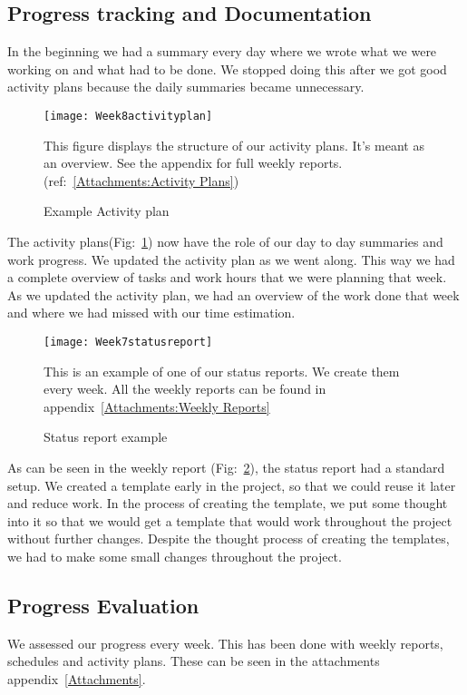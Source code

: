     \subsection{Progress tracking and Documentation}\label{Progress tracking and Documentation}
    In the beginning we had a summary every day where we wrote what we were working on and what had to be done. We stopped doing this after we got good activity plans because the daily summaries became unnecessary. 
    
    \begin{figure}[H]
        \centering
        \texttt{[image: Week8activityplan]}
        \caption{Example Activity plan}
        This figure displays the structure of our activity plans. It's meant as an overview. See the appendix for full weekly reports. 
        (ref:~\ref{Attachments:Activity Plans})
        \label{fig:Week8activityplan}
    \end{figure}
    
    The activity plans(Fig:~\ref{fig:Week8activityplan}) now have the role of our day to day summaries and work progress. We updated the activity plan as we went along. This way we had a complete overview of tasks and work hours that we were planning that week. As we updated the activity plan, we had an overview of the work done that week and where we had missed with our time estimation. 
    
    \begin{figure}[H]
        \centering
        \texttt{[image: Week7statusreport]}
        \caption{Status report example}
        This is an example of one of our status reports. We create them every week. All the weekly reports can be found in appendix~\ref{Attachments:Weekly Reports}
        \label{fig:Week7statusreport}
    \end{figure}
    
    As can be seen in the weekly report (Fig:~\ref{fig:Week7statusreport}), the status report had a standard setup. We created a template early in the project, so that we could reuse it later and reduce work. In the process of creating the template, we put some thought into it so that we would get a template that would work throughout the project without further changes. Despite the thought process of creating the templates, we had to make some small changes throughout the project.
    
       \subsection{Progress Evaluation}\label{Progress Evaluation}
    We assessed our progress every week. This has been done with weekly reports, schedules and activity plans. These can be seen in the attachments appendix~\ref{Attachments}.
    
